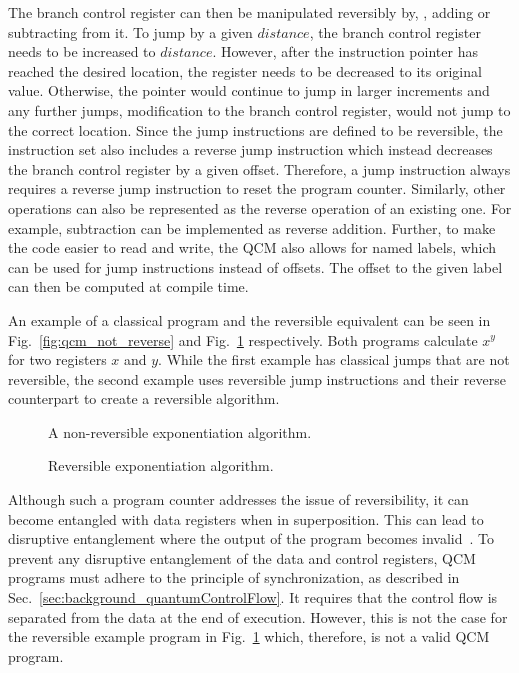The branch control register can then be manipulated reversibly by, \eg, adding or subtracting from it. To jump by a given $distance$, the branch control register needs to be increased to $distance$. However, after the instruction pointer has reached the desired location, the register needs to be decreased to its original value. Otherwise, the pointer would continue to jump in larger increments and any further jumps, \ie modification to the branch control register, would not jump to the correct location. Since the jump instructions are defined to be reversible, the instruction set also includes a reverse jump instruction which instead decreases the branch control register by a given offset. Therefore, a jump instruction always requires a reverse jump instruction to reset the program counter. Similarly, other operations can also be represented as the reverse operation of an existing one. For example, subtraction can be implemented as reverse addition. Further, to make the code easier to read and write, the QCM also allows for named labels, which can be used for jump instructions instead of offsets. The offset to the given label can then be computed at compile time. 

An example of a classical program and the reversible equivalent can be seen in Fig.~\ref{fig:qcm_not_reverse} and Fig.~\ref{fig:qcm_reverse} respectively. Both programs calculate $x^y$ for two registers $x$ and $y$. While the first example has classical jumps that are not reversible, the second example uses reversible jump instructions and their reverse counterpart to create a reversible algorithm.

\begin{figure}[htp]
    \centering     
    \begin{minipage}{.40\textwidth}
        
        \caption{A non-reversible exponentiation algorithm.}
        \label{fig:qcm_not_reverse}
    \end{minipage}
    \hfill
    \begin{minipage}{.50\textwidth}
        
        \caption{Reversible exponentiation algorithm.}    
        \label{fig:qcm_reverse}
    \end{minipage}
\end{figure}

Although such a program counter addresses the issue of reversibility, it can become entangled with data registers when in superposition. This can lead to disruptive entanglement where the output of the program becomes invalid~\cite{YVC24}. To prevent any disruptive entanglement of the data and control registers, QCM programs must adhere to the principle of synchronization, as described in Sec.~\ref{sec:background_quantumControlFlow}. 
It requires that the control flow is separated from the data at the end of execution. However, this is not the case for the reversible example program in Fig.~\ref{fig:qcm_reverse} which, therefore, is not a valid QCM program.


